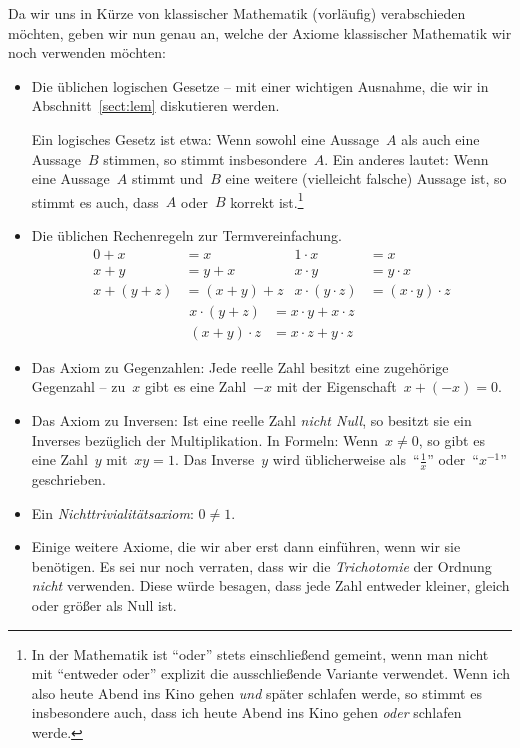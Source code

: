 \documentclass[twoside]{../zirkelblatt}
\theoremstyle{definition}
\theoremstyle{plain}
\theoremstyle{remark}
\begin{document}
Da wir uns in Kürze von klassischer Mathematik (vorläufig) verabschieden
möchten, geben wir nun genau an, welche der Axiome klassischer Mathematik wir
noch verwenden möchten:
\begin{itemize}
\item Die üblichen logischen Gesetze -- mit einer wichtigen Ausnahme, die wir
in Abschnitt~\ref{sect:lem} diskutieren werden.

Ein logisches Gesetz ist etwa: Wenn sowohl eine Aussage~$A$
als auch eine Aussage~$B$ stimmen, so stimmt insbesondere~$A$. Ein anderes
lautet: Wenn eine Aussage~$A$ stimmt und~$B$ eine weitere (vielleicht falsche)
Aussage ist, so stimmt es auch, dass~$A$ oder~$B$ korrekt ist.\footnote{In der
Mathematik ist "`oder"' stets einschließend gemeint, wenn man nicht mit
"`entweder oder"' explizit die ausschließende Variante verwendet. Wenn ich
also heute Abend ins Kino gehen \emph{und} später schlafen werde, so stimmt es
insbesondere auch, dass ich heute Abend ins Kino gehen \emph{oder} schlafen
werde.}
\item Die üblichen Rechenregeln zur Termvereinfachung.
\begin{align*}
  0 + x &= x &
  1 \cdot x &= x \\
  x + y &= y + x &
  x \cdot y &= y \cdot x \\
  x + (y + z) &= (x + y) + z &
  x \cdot (y \cdot z) &= (x \cdot y) \cdot z
\end{align*}
\begin{align*}
  x \cdot (y + z) &= x \cdot y + x \cdot z \\
  (x + y) \cdot z &= x \cdot z + y \cdot z
\end{align*}
\item Das Axiom zu Gegenzahlen: Jede reelle Zahl besitzt eine zugehörige
Gegenzahl -- zu~$x$ gibt es eine Zahl~$-x$ mit der Eigenschaft~$x + (-x) = 0$.
\item \label{ax:nichtnullinv}Das Axiom zu Inversen: Ist eine reelle Zahl \emph{nicht Null}, so besitzt
sie ein Inverses bezüglich der Multiplikation. In Formeln: Wenn~$x \neq 0$, so
gibt es eine Zahl~$y$ mit~$xy = 1$. Das Inverse~$y$ wird üblicherweise
als~"`$\frac{1}{x}$"' oder~"`$x^{-1}$"' geschrieben.
\item Ein \emph{Nichttrivialitätsaxiom}: $0 \neq 1$.
\item Einige weitere Axiome, die wir aber erst dann einführen, wenn wir sie
benötigen. Es sei nur noch verraten, dass wir die \emph{Trichotomie} der Ordnung
\emph{nicht} verwenden. Diese würde besagen, dass jede Zahl entweder kleiner,
gleich oder größer als Null ist.
\end{itemize}
\end{document}
